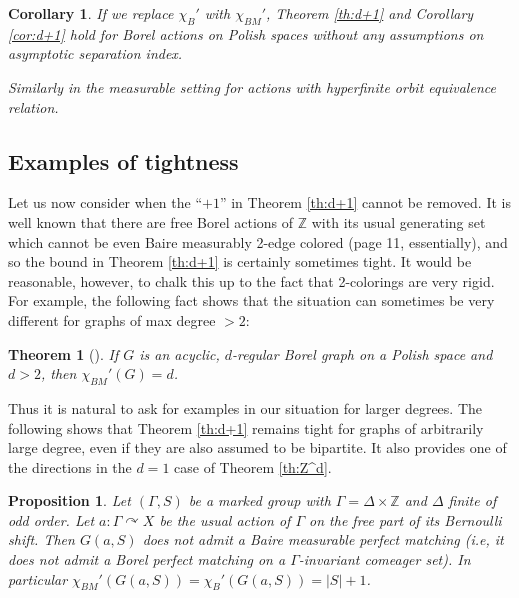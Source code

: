 \documentclass[12pt]{article}
\newcommand{\0}{\varnothing}
\newcommand{\Z}{\mathbb{Z}}
\newtheorem{theorem}{Theorem}
\newtheorem{corollary}{Corollary}
\newtheorem{prop}{Proposition}
\begin{document}
\begin{corollary}
If we replace $\chi_B'$ with $\chi_{BM}'$, Theorem \ref{th:d+1} and Corollary \ref{cor:d+1} hold for Borel actions on Polish spaces without any assumptions on asymptotic separation index. 

Similarly in the measurable setting for actions with hyperfinite orbit equivalence relation. 
\end{corollary}

\subsection{Examples of tightness}

Let us now consider when the ``$+1$'' in Theorem \ref{th:d+1} cannot be removed. It is well known that there are free Borel actions of $\Z$ with its usual generating set which cannot be even Baire measurably 2-edge colored \cite{KST} (page 11, essentially), and so the bound in Theorem \ref{th:d+1} is certainly sometimes tight. It would be reasonable, however, to chalk this up to the fact that 2-colorings are very rigid. For example, the following fact shows that the situation can sometimes be very different for graphs of max degree $>2$:

\begin{theorem}[\cite{KM}]
If $G$ is an acyclic, $d$-regular Borel graph on a Polish space and $d > 2$, then $\chi_{BM}'(G) = d$.
\end{theorem}

Thus it is natural to ask for examples in our situation for larger degrees. The following shows that Theorem \ref{th:d+1} remains tight for graphs of arbitrarily large degree, even if they are also assumed to be bipartite. It also provides one of the directions in the $d=1$ case of Theorem \ref{th:Z^d}.

\begin{prop}\label{prop:Zexample}
Let $(\Gamma,S)$ be a marked group with $\Gamma = \Delta \times \Z$ and $\Delta$ finite of odd order. Let $a:\Gamma \curvearrowright X$ be the usual action of $\Gamma$ on the free part of its Bernoulli shift. Then $G(a,S)$ does not admit a Baire measurable perfect matching (i.e, it does not admit a Borel perfect matching on a $\Gamma$-invariant comeager set). In particular $\chi_{BM}'(G(a,S)) = \chi_B'(G(a,S)) = |S|+1$.
\end{prop}
\end{document}
